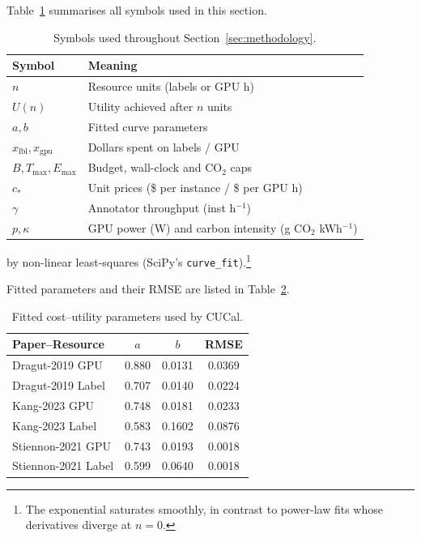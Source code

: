 \documentclass[11pt]{article}
\begin{document}
Table~\ref{tab:notation} summarises all symbols used in this section.

\begin{table}[htbp]
  \centering
  \caption{Symbols used throughout Section~\ref{sec:methodology}.}
  \begin{tabular}{@{}ll@{}}
    \toprule
    Symbol & Meaning \\ \midrule
    $n$            & Resource units (labels or GPU h) \\
    $U(n)$         & Utility achieved after $n$ units \\
    $a,b$          & Fitted curve parameters \\
    $x_{\mathrm{lbl}},x_{\mathrm{gpu}}$ & Dollars spent on labels / GPU \\
    $B,T_{\max},E_{\max}$ & Budget, wall-clock and CO$_2$ caps \\
    $c_{\ast}$     & Unit prices (\$ per instance / \$ per GPU h) \\
    $\gamma$       & Annotator throughput (inst h$^{-1}$) \\
    $p,\kappa$     & GPU power (W) and carbon intensity (g CO$_2$ kWh$^{-1}$) \\
    \bottomrule
  \end{tabular}
  \label{tab:notation}
\end{table}

by non-linear least-squares (SciPy’s
\texttt{curve\_fit}).\footnote{The exponential saturates smoothly,
in contrast to power-law fits whose derivatives diverge at \(n{=}0\).}

Fitted parameters and their RMSE are listed in Table~\ref{tab:curves}.

\begin{table}[ht]
  \centering
  \caption{Fitted cost–utility parameters used by CUCal.}
  \label{tab:curves}
  \begin{tabular}{lccc}
    \toprule
    Paper–Resource            & $a$     & $b$      & RMSE  \\
    \midrule
    Dragut-2019 GPU           & 0.880   & 0.0131   & 0.0369 \\
    Dragut-2019 Label         & 0.707   & 0.0140   & 0.0224 \\
    Kang-2023 GPU             & 0.748   & 0.0181   & 0.0233 \\
    Kang-2023 Label           & 0.583   & 0.1602   & 0.0876 \\
    Stiennon-2021 GPU         & 0.743   & 0.0193   & 0.0018 \\
    Stiennon-2021 Label       & 0.599   & 0.0640   & 0.0018 \\
    \bottomrule
  \end{tabular}
\end{table}
\end{document}
